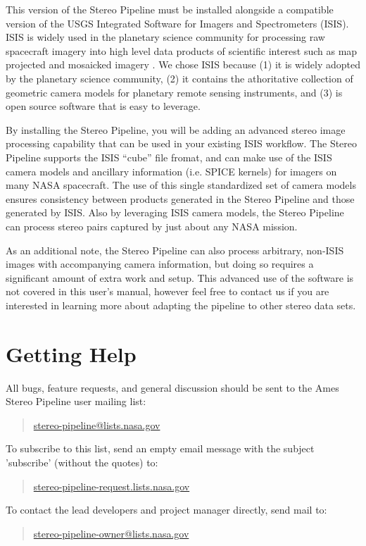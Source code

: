 This version of the Stereo Pipeline must be installed alongside a
compatible version of the USGS Integrated Software for Imagers and
Spectrometers (ISIS).  ISIS is widely used in the planetary science
community for processing raw spacecraft imagery into high level data
products of scientific interest such as map projected and mosaicked
imagery \cite{2004LPI....35.2039A, 1997LPI....28..387G, ISIS_website}.
We chose ISIS because (1) it is widely adopted by the planetary
science community, (2) it contains the athoritative collection of
geometric camera models for planetary remote sensing instruments, and
(3) is open source software that is easy to leverage.

By installing the Stereo Pipeline, you will be adding an advanced
stereo image processing capability that can be used in your existing
ISIS workflow.  The Stereo Pipeline supports the ISIS ``cube'' file
fromat, and can make use of the ISIS camera models and ancillary
information (i.e. SPICE kernels) for imagers on many NASA spacecraft.
The use of this single standardized set of camera models ensures
consistency between products generated in the Stereo Pipeline and
those generated by ISIS.  Also by leveraging ISIS camera models, the
Stereo Pipeline can process stereo pairs captured by just about any
NASA mission.  

As an additional note, the Stereo Pipeline can also process arbitrary,
non-ISIS images with accompanying camera information, but doing so
requires a significant amount of extra work and setup.  This advanced
use of the software is not covered in this user's manual, however feel
free to contact us if you are interested in learning more about
adapting the pipeline to other stereo data sets.

%
%
%
%


\section{Getting Help}

All bugs, feature requests, and general discussion should be sent to
the Ames Stereo Pipeline user mailing list:
\begin{quote}
\indent \url{stereo-pipeline@lists.nasa.gov}
\end{quote}
To subscribe to this list, send an empty email message with the
subject 'subscribe' (without the quotes) to:
\begin{quote}
\indent \url{stereo-pipeline-request.lists.nasa.gov}
\end{quote}
To contact the lead developers and project manager directly, send mail
to:
\begin{quote}
\indent \url{stereo-pipeline-owner@lists.nasa.gov}
\end{quote}

